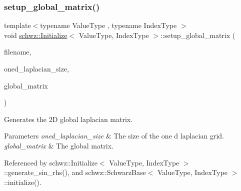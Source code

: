 \subsubsection{\texorpdfstring{setup\+\_\+global\+\_\+matrix()}{setup\_global\_matrix()}}
{\footnotesize\ttfamily template$<$typename Value\+Type , typename Index\+Type $>$ \\
void \hyperlink{classschwz_1_1Initialize}{schwz\+::\+Initialize}$<$ Value\+Type, Index\+Type $>$\+::setup\+\_\+global\+\_\+matrix (\begin{DoxyParamCaption}\item[{const std\+::string \&}]{filename,  }\item[{const gko\+::size\+\_\+type \&}]{oned\+\_\+laplacian\+\_\+size,  }\item[{std\+::shared\+\_\+ptr$<$ gko\+::matrix\+::\+Csr$<$ Value\+Type, Index\+Type $>$$>$ \&}]{global\+\_\+matrix }\end{DoxyParamCaption})}



Generates the 2D global laplacian matrix. 


\begin{DoxyParams}{Parameters}
{\em oned\+\_\+laplacian\+\_\+size} & The size of the one d laplacian grid. \\
\hline
{\em global\+\_\+matrix} & The global matrix. \\
\hline
\end{DoxyParams}


Referenced by schwz\+::\+Initialize$<$ Value\+Type, Index\+Type $>$\+::generate\+\_\+sin\+\_\+rhs(), and schwz\+::\+Schwarz\+Base$<$ Value\+Type, Index\+Type $>$\+::initialize().

\mbox{\label{classschwz_1_1Initialize_ad24764a4ded54c2af6a5111ba8c8228f}} 
